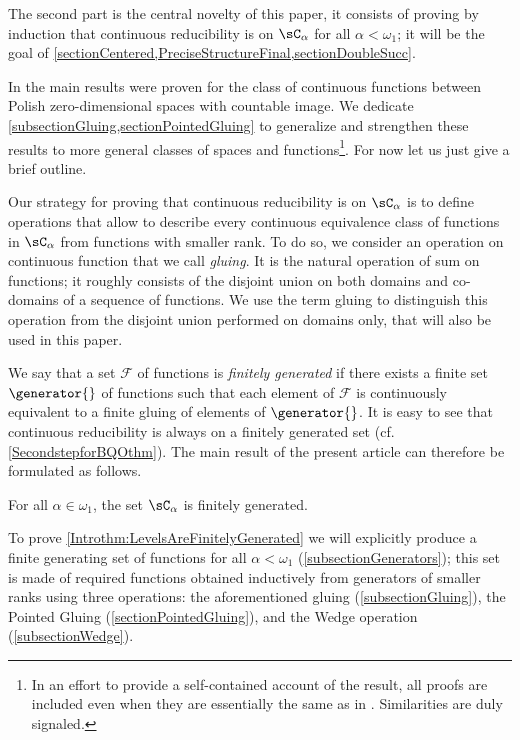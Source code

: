The second part is the central novelty of this paper, it consists of proving by induction that continuous reducibility is \bqo{} on $\sC_\alpha$ for all $\alpha<\omega_1$;
it will be the goal of \cref{sectionCentered,PreciseStructureFinal,sectionDoubleSucc}.

In \cite{carroy2013quasi} the main results were proven for the class of continuous functions between Polish zero-dimensional spaces with countable image.
We dedicate \cref{subsectionGluing,sectionPointedGluing} to generalize and strengthen these results to more general classes of spaces and functions\footnote{In an effort to provide a self-contained account of the result, all proofs are included even when they are essentially the same as in \cite{carroy2013quasi}. Similarities are duly signaled.}.
For now let us just give a brief outline.

Our strategy for proving that continuous reducibility is \bqo{} on $\sC_\alpha$ is to define operations that allow to describe
every continuous equivalence class of functions in $\sC_\alpha$ from functions with smaller rank.
To do so, we consider an operation on continuous function that we call \emph{gluing}. It is the natural operation of sum on functions;
it roughly consists of the disjoint union on both domains and co-domains of a sequence of functions.
We use the term gluing to distinguish this operation from the disjoint union performed on domains only, that will also be used in this paper.

We say that a set $\mathcal{F}$ of functions is \emph{finitely generated} if there exists a finite set $\generator{}$ of functions such that each element of $\mathcal{F}$
is continuously equivalent to a finite gluing of elements of $\generator{}$.
It is easy to see that continuous reducibility is always \bqo{} on a finitely generated set (cf. \cref{SecondstepforBQOthm}). 
The main result of the present article can therefore be formulated as follows.

\begin{theorem}\label{Introthm:LevelsAreFinitelyGenerated}
For all $\alpha\in\omega_1$, the set $\sC_\alpha$ is finitely generated.
\end{theorem}

To prove \cref{Introthm:LevelsAreFinitelyGenerated} we will explicitly produce a finite generating set of functions for all $\alpha<\omega_1$ (\cref{subsectionGenerators});
this set is made of required functions obtained inductively from generators of smaller ranks using three operations:
the aforementioned gluing (\cref{subsectionGluing}), the Pointed Gluing (\cref{sectionPointedGluing}),
and the Wedge operation (\cref{subsectionWedge}).

